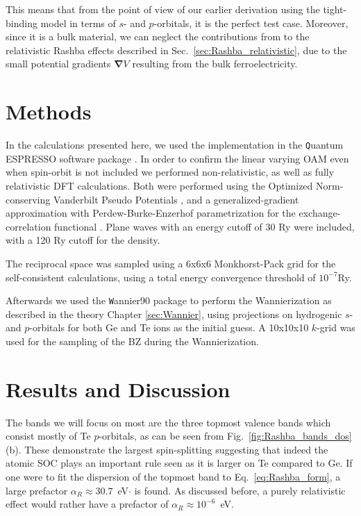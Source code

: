 This means that from the point of view of our earlier derivation using the tight-binding model in terms of $s$- and $p$-orbitals, it is the perfect test case.
Moreover, since it is a bulk material, we can neglect the contributions from to the relativistic Rashba effects described in Sec.~\ref{sec:Rashba_relativistic}, due to the small potential gradients $\bm{\nabla}V$ resulting from the bulk ferroelectricity.

\section{Methods}
In the calculations presented here, we used the implementation in the {\texttt Quantum ESPRESSO} software package \cite{Giannozzi2009}.
In order to confirm the linear varying OAM even when spin-orbit is not included we performed non-relativistic, as well as fully relativistic DFT calculations.
Both were performed using the Optimized Norm-conserving Vanderbilt Pseudo Potentials \cite{Hamann2013}, and a generalized-gradient approximation with Perdew-Burke-Enzerhof parametrization for the exchange-correlation functional \cite{Perdew1996}.
Plane waves with an energy cutoff of 30 Ry were included, with a 120 Ry cutoff for the density.

The reciprocal space was sampled using a 6x6x6 Monkhorst-Pack grid \cite{Pack1977} for the self-consistent calculations, using a total energy convergence threshold of $10^{-7}$Ry.

Afterwards we used the {\texttt Wannier90} package \cite{Mostofi2014AnFunctions} to perform the Wannierization as described in the theory Chapter \ref{sec:Wannier}, using projections on hydrogenic $s$- and $p$-orbitals for both Ge and Te ions as the initial guess.
A 10x10x10 $k$-grid was used for the sampling of the BZ during the Wannierization. 


\section{Results and Discussion}

The bands we will focus on most are the three topmost valence bands which consist mostly of Te $p$-orbitals, as can be seen from Fig.~\ref{fig:Rashba_bands_dos}(b).
These demonstrate the largest spin-splitting suggesting that indeed the atomic SOC plays an important rule seen as it is larger on Te compared to Ge.
If one were to fit the dispersion of the topmost band to Eq.~\ref{eq:Rashba_form}, a large prefactor $\alpha_R\approx 30.7$~eV$\cdot$\angstrom \cite{DiSante2013} is found.
As discussed before, a purely relativistic effect would rather have a prefactor of $\alpha_R \approx 10^{-6}$~eV.

